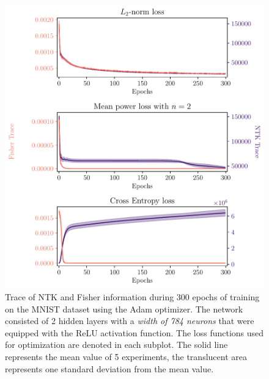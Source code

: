 \begin{figure}
	\centering
	\includegraphics[width=\textwidth]{text/results/FisherNTKComparisonPlots/Triple_comparison_losses2_784.pdf}
	\caption{Trace of NTK and Fisher information during 300 epochs of training on the MNIST dataset using the Adam optimizer. The network consisted of 2 hidden layers with a \emph{width of 784 neurons} that were equipped with the ReLU activation function. The loss functions used for optimization are denoted in each subplot. The solid line represents the mean value of 5 experiments, the translucent area represents one standard deviation from the mean value.}
	\label{fig:MNISTTraceComparison3}
\end{figure}
